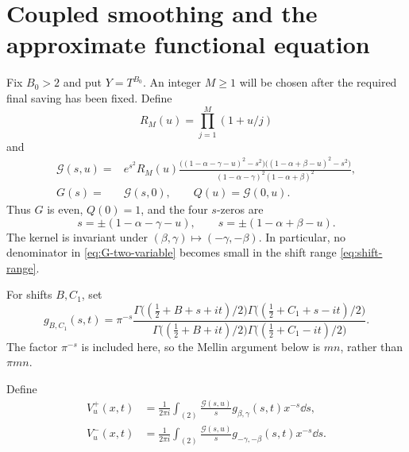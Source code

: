 \section{Coupled smoothing and the approximate functional equation}
\label{sec:smoothing}

Fix $B_0>2$ and put $Y=T^{B_0}$.  An integer $M\geq1$ will be chosen after
the required final saving has been fixed.  Define
\begin{equation}\label{eq:R-M}
                         R_M(u)=\prod_{j=1}^{M}(1+u/j)
\end{equation}
and
\begin{align}
 \mathcal G(s,u)
 ={}&e^{s^2}R_M(u)
 \frac{\bigl((1-\alpha-\gamma-u)^2-s^2\bigr)
       \bigl((1-\alpha+\beta-u)^2-s^2\bigr)}
      {(1-\alpha-\gamma)^2(1-\alpha+\beta)^2},
 \label{eq:G-two-variable}\\
 G(s)={}&\mathcal G(s,0),\qquad Q(u)=\mathcal G(0,u).
 \label{eq:G-Q}
\end{align}
Thus $G$ is even, $Q(0)=1$, and the four $s$-zeros are
\begin{equation}\label{eq:zeta-one-zeros}
 s=\pm(1-\alpha-\gamma-u),\qquad
 s=\pm(1-\alpha+\beta-u).
\end{equation}
The kernel is invariant under
$(\beta,\gamma)\mapsto(-\gamma,-\beta)$.  In particular, no denominator in
\eqref{eq:G-two-variable} becomes small in the shift range
\eqref{eq:shift-range}.

For shifts $B,C_1$, set
\begin{equation}\label{eq:g-def}
 g_{B,C_1}(s,t)=\pi^{-s}
 \frac{
 \Gamma\bigl((\frac12+B+s+it)/2\bigr)
 \Gamma\bigl((\frac12+C_1+s-it)/2\bigr)}{
 \Gamma\bigl((\frac12+B+it)/2\bigr)
 \Gamma\bigl((\frac12+C_1-it)/2\bigr)}.
\end{equation}
The factor $\pi^{-s}$ is included here, so the Mellin argument below is
$mn$, rather than $\pi mn$.

Define
\begin{align}
 V_u^+(x,t)&=\frac{1}{2\pi i}\int_{(2)}
      \frac{\mathcal G(s,u)}{s}g_{\beta,\gamma}(s,t)x^{-s}\dd s,
 \label{eq:V-plus}\\
 V_u^-(x,t)&=\frac{1}{2\pi i}\int_{(2)}
      \frac{\mathcal G(s,u)}{s}g_{-\gamma,-\beta}(s,t)x^{-s}\dd s.
 \label{eq:V-minus}
\end{align}

